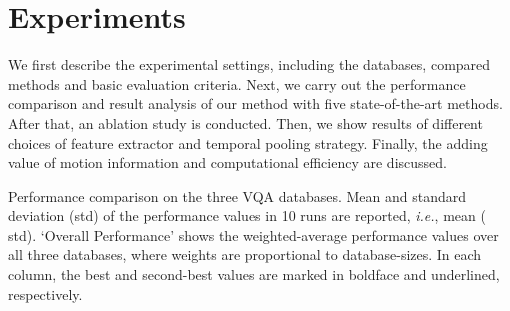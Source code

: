 \documentclass[sigconf]{acmart}
\begin{document}
\section{Experiments}
\label{sec:experiments}
We first describe the experimental settings, including the databases, compared methods and basic evaluation criteria. Next, we carry out the performance comparison and result analysis of our method with five state-of-the-art methods. After that, an ablation study is conducted. Then, we show results of different choices of feature extractor and temporal pooling strategy. Finally, the adding value of motion information and computational efficiency are discussed.
\begin{table*}[!hbt]
    \centering
    \caption{Performance comparison on the three VQA databases. Mean and standard deviation (std) of the performance values in 10 runs are reported, \textit{i.e.}, mean ( std).  `Overall Performance' shows the weighted-average performance values over all three databases, where weights are proportional to database-sizes. In each column, the best and second-best values are marked in boldface and underlined, respectively.}
    \label{tab:performance}

    \begin{small}
    

\end{small}
\end{table*}
\end{document}

